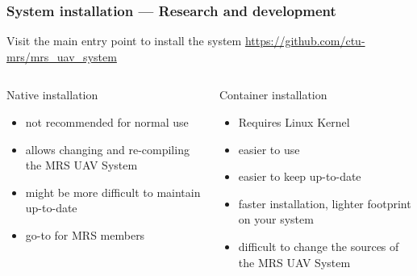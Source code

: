 \documentclass[aspectratio=169]{beamer}
\begin{document}
\begin{frame}
\frametitle{System installation --- Research and development}

  \begin{block}{Visit the main entry point to install the system}
    \centering
    \Large\url{https://github.com/ctu-mrs/mrs_uav_system}
  \end{block}

  \begin{columns}[c]

  \begin{block}{{\color{red} Native installation}}
    \begin{itemize}
      \item not recommended for normal use
      \item allows changing and re-compiling the MRS UAV System
      \item might be more difficult to maintain up-to-date
      \item go-to for MRS members
    \end{itemize}
  \end{block}

  \begin{block}{Container installation}
    \begin{itemize}
      \item Requires Linux Kernel
      \item easier to use
      \item easier to keep up-to-date
      \item faster installation, lighter footprint on your system
      \item {\color{red} difficult to change the sources of the MRS UAV System}
    \end{itemize}
  \end{block}

  \end{columns}

\end{frame}


\end{document}
